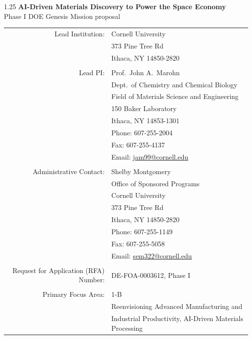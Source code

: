 \documentclass[../main.tex]{subfiles}
\begin{document}
\thispagestyle{empty}

\hrulefill

{\large
\centering
\begin{spacing}{1.25}
\textbf{AI-Driven Materials Discovery to Power the Space Economy} \\
Phase I DOE Genesis Mission proposal
\end{spacing}
}

\hrulefill

\vspace{12pt}

\begin{tabular}{r l}
Lead Institution: & Cornell University\\
& 373 Pine Tree Rd\\
& Ithaca, NY 14850-2820\\
\\
Lead PI: & Prof.\ John A.\ Marohn \\
& Dept.\ of Chemistry and Chemical Biology \\
& Field of Materials Science and Engineering \\
& 150 Baker Laboratory \\
& Ithaca, NY 14853-1301 \\
& Phone: 607-255-2004 \\
& Fax: 607-255-4137 \\
& Email: \href{mailto:jam99cornell.edu}{jam99@cornell.edu}\\
\\
Administrative Contact: & Shelby Montgomery \\
& Office of Sponsored Programs \\
& Cornell University \\
& 373 Pine Tree Rd\\
& Ithaca, NY 14850-2820 \\
& Phone: 607-255-1149\\
& Fax: 607-255-5058\\
& Email: \href{mailto:sem322@cornell.edu }{sem322@cornell.edu}\\
\\
Request for Application (RFA) Number:
& DE-FOA-0003612, Phase I \\ 
\\
Primary Focus Area: & 1-B \\
 & Reenvisioning Advanced Manufacturing and \\
 & Industrial Productivity, AI-Driven Materials Processing \\

\end{tabular}
\end{document}
